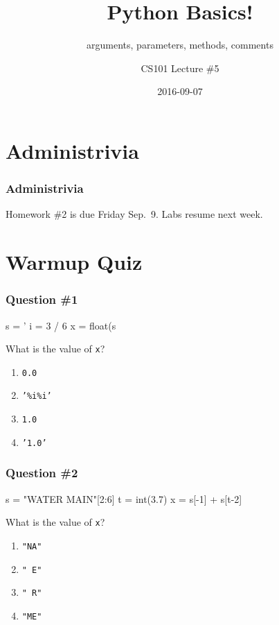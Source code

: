 \documentclass[11pt]{beamer}
\title{Python Basics!}
\subtitle{arguments, parameters, methods, comments}
\author{CS101 Lecture \#5}
\date{2016-09-07}
\begin{document}
  \setcounter{showProgressBar}{0}
  \setcounter{showSlideNumbers}{0}

\frame{\titlepage}

\setcounter{framenumber}{0}
\setcounter{showProgressBar}{1}
\setcounter{showSlideNumbers}{1}

\section{Administrivia}

\begin{frame}
  \frametitle{Administrivia}
  \Enlarge
  \begin{itemize}
  \myitem  Homework \#2 is due Friday Sep.\ 9.
  \myitem  Labs resume next week.
  \end{itemize}
\end{frame}

\section{Warmup Quiz}

\begin{frame}[fragile]
  \frametitle{Question \#1}
  \Enlarge

  \begin{semiverbatim}
s = '%
i = 3 / 6
x = float(s%
  \end{semiverbatim}
  What is the value of \texttt{x}?
  \begin{enumerate}[label=\Alph*]
  \item  \texttt{0.0}
  \item  \texttt{'\%i\%i'}
  \item  \texttt{1.0}
  \item  \texttt{'1.0'}
  \end{enumerate}
\end{frame}

\begin{frame}[fragile]
  \frametitle{Question \#2}
  \Enlarge

  \begin{semiverbatim}
s = "WATER MAIN"[2:6]
t = int(3.7)
x = s[-1] + s[t-2]
  \end{semiverbatim}
  What is the value of \texttt{x}?
  \begin{enumerate}[label=\Alph*]
  \item  \texttt{"NA"}
  \item  \texttt{" E"}
  \item  \texttt{" R"}
  \item  \texttt{"ME"}
  \end{enumerate}
\end{frame}
\end{document}
